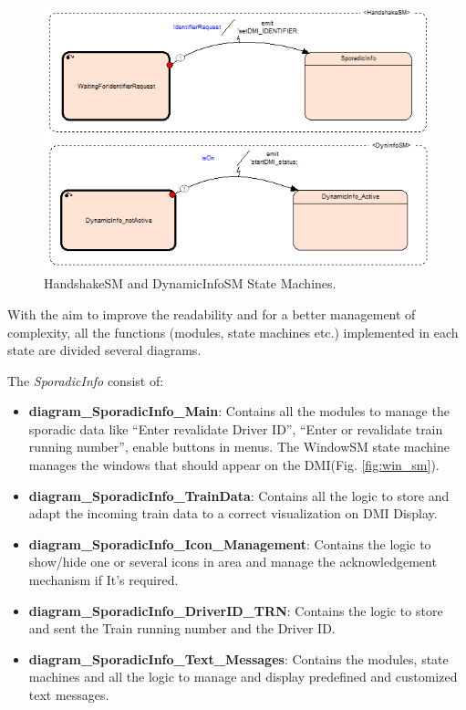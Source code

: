   \begin{figure} 
  \centering
  \includegraphics[scale=0.8]{images/DynSporInfoSM}
  \caption{HandshakeSM and DynamicInfoSM State Machines.}
  \label{fig:DynSporSM}
  \end{figure}
  


  With the aim to improve the readability and for a better management of complexity, all the functions (modules, state machines etc.) implemented in each state are divided several diagrams.
  
  The \textit{SporadicInfo} consist of:
  \begin{itemize}
  	\item \textbf{diagram\_SporadicInfo\_Main}: Contains all the modules to manage the sporadic data like ``Enter revalidate Driver ID'', ``Enter or revalidate train running number'', enable buttons in menus. The WindowSM state machine manages the windows that should appear on the DMI(Fig. \ref{fig:win_sm}).
  	
  	\item \textbf{ diagram\_SporadicInfo\_TrainData}: Contains all the logic to store and adapt the incoming train data to a correct visualization on DMI Display.
  	
  	\item \textbf{diagram\_SporadicInfo\_Icon\_Management}: Contains the logic to show/hide one or several icons in area and manage the acknowledgement mechanism if It's required.
  	
  	\item \textbf{ diagram\_SporadicInfo\_DriverID\_TRN}: Contains the logic to store and sent the Train running number and the Driver ID.
  	
  	\item \textbf{diagram\_SporadicInfo\_Text\_Messages}: Contains the modules, state machines and all the logic to manage and display predefined and customized text messages.
  \end{itemize}
  
